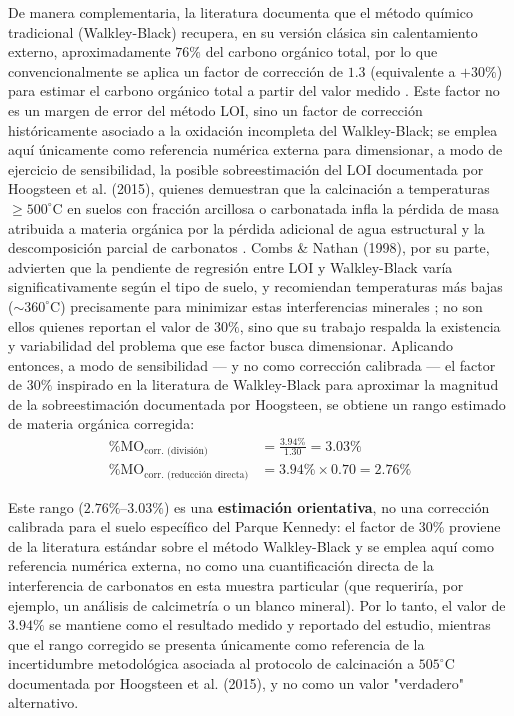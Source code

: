 \documentclass[fleqn]{jaes}
\begin{document}
De manera complementaria, la literatura documenta que el método químico tradicional (Walkley-Black) recupera, en su versión clásica sin calentamiento externo, aproximadamente $76\%$ del carbono orgánico total, por lo que convencionalmente se aplica un factor de corrección de $1.3$ (equivalente a $+30\%$) para estimar el carbono orgánico total a partir del valor medido \cite{NelsonSommers1982}. Este factor no es un margen de error del método LOI, sino un factor de corrección históricamente asociado a la oxidación incompleta del Walkley-Black; se emplea aquí únicamente como referencia numérica externa para dimensionar, a modo de ejercicio de sensibilidad, la posible sobreestimación del LOI documentada por Hoogsteen et al. (2015), quienes demuestran que la calcinación a temperaturas $\geq 500^\circ\text{C}$ en suelos con fracción arcillosa o carbonatada infla la pérdida de masa atribuida a materia orgánica por la pérdida adicional de agua estructural y la descomposición parcial de carbonatos \cite{Hoogsteen2015}. Combs \& Nathan (1998), por su parte, advierten que la pendiente de regresión entre LOI y Walkley-Black varía significativamente según el tipo de suelo, y recomiendan temperaturas más bajas ($\sim 360^\circ\text{C}$) precisamente para minimizar estas interferencias minerales \cite{Combs1998}; no son ellos quienes reportan el valor de $30\%$, sino que su trabajo respalda la existencia y variabilidad del problema que ese factor busca dimensionar. Aplicando entonces, a modo de sensibilidad --- y no como corrección calibrada --- el factor de $30\%$ inspirado en la literatura de Walkley-Black para aproximar la magnitud de la sobreestimación documentada por Hoogsteen, se obtiene un rango estimado de materia orgánica corregida:
\begin{align}
\%\text{MO}_{\text{corr. (división)}} &= \frac{3.94\%}{1.30} = 3.03\% \\
\%\text{MO}_{\text{corr. (reducción directa)}} &= 3.94\% \times 0.70 = 2.76\%
\end{align}

Este rango ($2.76\%$--$3.03\%$) es una \textbf{estimación orientativa}, no una corrección calibrada para el suelo específico del Parque Kennedy: el factor de $30\%$ proviene de la literatura estándar sobre el método Walkley-Black \cite{NelsonSommers1982} y se emplea aquí como referencia numérica externa, no como una cuantificación directa de la interferencia de carbonatos en esta muestra particular (que requeriría, por ejemplo, un análisis de calcimetría o un blanco mineral). Por lo tanto, el valor de $3.94\%$ se mantiene como el resultado medido y reportado del estudio, mientras que el rango corregido se presenta únicamente como referencia de la incertidumbre metodológica asociada al protocolo de calcinación a $505^\circ\text{C}$ documentada por Hoogsteen et al. (2015), y no como un valor "verdadero" alternativo.
\end{document}
